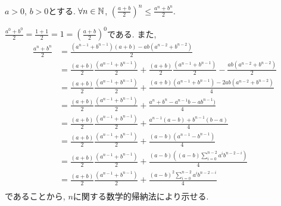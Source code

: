 \newest
\begin{prop}
  \label{p:20230909}
  $a>0$, $b>0$とする.
  $\forall n\in\mathbb{N}$,
  $\left(\frac{a+b}{2}\right)^n\leq \frac{a^n+b^n}{2}$.
\end{prop}
\begin{proof**}
  $\frac{a^0+b^0}{2}=\frac{1+1}{2}=1= \left(\frac{a+b}{2}\right)^0$である.
  また, 
  \begin{align*}
    \frac{a^n+b^n}{2}
    &=
    \frac{(a^{n-1}+b^{n-1})(a+b)-ab(a^{n-2}+b^{n-2})}{2}\\
    &=
    \frac{(a+b)}{2}\frac{(a^{n-1}+b^{n-1})}{2}
    +\frac{(a+b)}{2}\frac{(a^{n-1}+b^{n-1})}{2}
    -\frac{ab(a^{n-2}+b^{n-2})}{2}\\
    &=
    \frac{(a+b)}{2}\frac{(a^{n-1}+b^{n-1})}{2}
    +\frac{(a+b)(a^{n-1}+b^{n-1})-2ab(a^{n-2}+b^{n-2})}{4}\\
    &=
    \frac{(a+b)}{2}\frac{(a^{n-1}+b^{n-1})}{2}
    +\frac{a^{n}+b^{n}-a^{n-1}b-ab^{n-1})}{4}\\
    &=
    \frac{(a+b)}{2}\frac{(a^{n-1}+b^{n-1})}{2}
    +\frac{a^{n-1}(a-b)+b^{n-1}(b-a)}{4}\\
    &=
    \frac{(a+b)}{2}\frac{(a^{n-1}+b^{n-1})}{2}
    +\frac{(a-b)(a^{n-1}-b^{n-1})}{4}\\
    &=
    \frac{(a+b)}{2}\frac{(a^{n-1}+b^{n-1})}{2}
    +\frac{(a-b)((a-b)\sum_{i=0}^{n-2}a^{i}b^{n-2-i})}{4}\\
    &=
    \frac{(a+b)}{2}\frac{(a^{n-1}+b^{n-1})}{2}
    +\frac{(a-b)^2\sum_{i=0}^{n-2}a^{i}b^{n-2-i}}{4}\\
  \end{align*}
  であることから,
  $n$に関する数学的帰納法により示せる.
\end{proof**}
